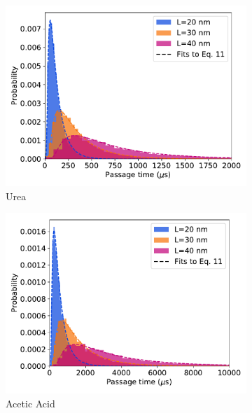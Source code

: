 \documentclass{article}
\begin{document}
  \begin{figure}[h]
  \centering
  \begin{subfigure}{0.45\textwidth}
  \includegraphics[width=\textwidth]{ad_fpt_distributions_URE.pdf}
  \caption{Urea}\label{fig:URE_ad_fpt_distributions}
  \end{subfigure}
  \begin{subfigure}{0.45\textwidth}
  \includegraphics[width=\textwidth]{ad_fpt_distributions_ACH.pdf}
  \caption{Acetic Acid}\label{fig:ACH_ad_fpt_distributions}
  \end{subfigure}
  \begin{subfigure}{0.45\textwidth}

\end{subfigure}
\end{figure}
\end{document}
